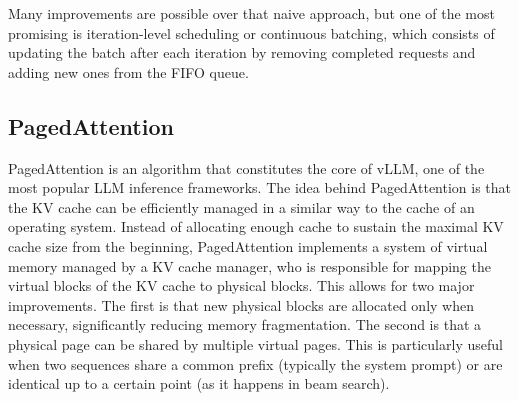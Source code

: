 \documentclass[conference]{IEEEtran}
\begin{document}
Many improvements are possible over that naive approach, but one of the most promising is iteration-level scheduling or continuous batching, which consists of updating the batch after each iteration by removing completed requests and adding new ones from the FIFO queue.

\subsection{PagedAttention}
PagedAttention is an algorithm that constitutes the core of vLLM, one of the most popular LLM inference frameworks. The idea behind PagedAttention is that the KV cache can be efficiently managed in a similar way to the cache of an operating system. Instead of allocating enough cache to sustain the maximal KV cache size from the beginning, PagedAttention implements a system of virtual memory managed by a KV cache manager, who is responsible for mapping the virtual blocks of the KV cache to physical blocks. This allows for two major improvements. The first is that new physical blocks are allocated only when necessary, significantly reducing memory fragmentation. The second is that a physical page can be shared by multiple virtual pages. This is particularly useful when two sequences share a common prefix (typically the system prompt) or are identical up to a certain point (as it happens in beam search).
\end{document}
